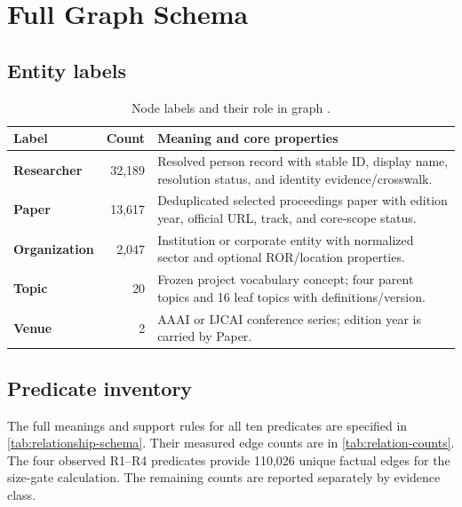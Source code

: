 \chapter{Full Graph Schema}
\label{app:schema}
\begingroup\small{}\titlespacing*{\section}{0pt}{12pt}{6pt}

\section{Entity labels}

\begin{table}[!hbtp]
  \centering
  \caption[Entity labels and core properties]{Node labels and their role in graph \GraphVersion.}
  \label{tab:node-labels}
  \small
  \begin{tabularx}{0.92\textwidth}{>{\bfseries}p{2.6cm}rX}
    \toprule
    Label & Count & Meaning and core properties\\
    \midrule
    Researcher & 32,189 & Resolved person record with stable ID, display name, resolution status, and identity evidence/crosswalk.\\
    Paper & 13,617 & Deduplicated selected proceedings paper with edition year, official URL, track, and core-scope status.\\
    Organization & 2,047 & Institution or corporate entity with normalized sector and optional ROR/location properties.\\
    Topic & 20 & Frozen project vocabulary concept; four parent topics and 16 leaf topics with definitions/version.\\
    Venue & 2 & AAAI or IJCAI conference series; edition year is carried by Paper.\\
    \bottomrule
  \end{tabularx}
\end{table}
\FloatBarrier

\section{Predicate inventory}

The full meanings and support rules for all ten predicates are specified in
\cref{tab:relationship-schema}. Their measured edge counts are in
\cref{tab:relation-counts}. The four observed R1--R4 predicates provide 110,026
unique factual edges for the size-gate calculation. The remaining counts are
reported separately by evidence class.

